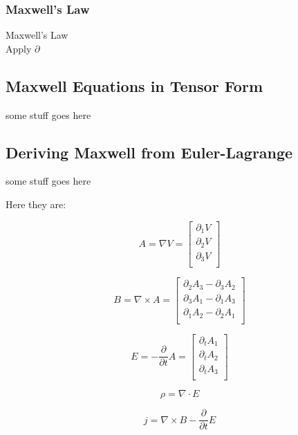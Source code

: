 \documentclass{article}
\begin{document}
\subsubsection{Maxwell's Law}
Maxwell's Law \\
Apply $\partial$

\subsection{Maxwell Equations in Tensor Form}

some stuff goes here

\subsection{Deriving Maxwell from Euler-Lagrange}

some stuff goes here


Here they are: 

\begin{equation}
A = \nabla  V =
        \begin{bmatrix}
            \partial_1 V \\
            \partial_2 V \\
            \partial_3 V \\
        \end{bmatrix}
\end{equation}

\begin{equation}
B = \nabla \times A = 
    \begin{bmatrix}
       \partial_2 A_3 - \partial_3 A_2 \\
       \partial_3 A_1 - \partial_1 A_3 \\
       \partial_1 A_2 - \partial_2 A_1 \\
    \end{bmatrix}
\end{equation}

\begin{equation}
E = - \frac{\partial}{\partial t} A = 
    \begin{bmatrix}
        \partial_t A_1 \\
        \partial_t A_2 \\
        \partial_t A_3 \\
    \end{bmatrix}
\end{equation}

\begin{equation}
\rho = \nabla \cdot E
\end{equation}

\begin{equation}
j = \nabla \times B - \frac{\partial}{\partial t} E
\end{equation}







% 
\end{document}
